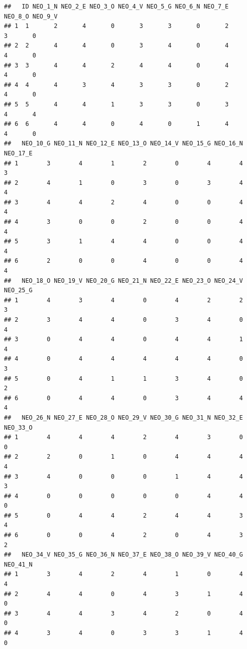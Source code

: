 \documentclass[
]{book}
\begin{document}
\begin{verbatim}
##   ID NEO_1_N NEO_2_E NEO_3_O NEO_4_V NEO_5_G NEO_6_N NEO_7_E NEO_8_O NEO_9_V
## 1  1       2       4       0       3       3       0       2       3       0
## 2  2       4       4       0       3       4       0       4       4       0
## 3  3       4       4       2       4       4       0       4       4       0
## 4  4       4       3       4       3       3       0       2       4       0
## 5  5       4       4       1       3       3       0       3       4       4
## 6  6       4       4       0       4       0       1       4       4       0
##   NEO_10_G NEO_11_N NEO_12_E NEO_13_O NEO_14_V NEO_15_G NEO_16_N NEO_17_E
## 1        3        4        1        2        0        4        4        3
## 2        4        1        0        3        0        3        4        4
## 3        4        4        2        4        0        0        4        4
## 4        3        0        0        2        0        0        4        4
## 5        3        1        4        4        0        0        4        4
## 6        2        0        0        4        0        0        4        4
##   NEO_18_O NEO_19_V NEO_20_G NEO_21_N NEO_22_E NEO_23_O NEO_24_V NEO_25_G
## 1        4        3        4        0        4        2        2        3
## 2        3        4        4        0        3        4        0        4
## 3        0        4        4        0        4        4        1        4
## 4        0        4        4        4        4        4        0        3
## 5        0        4        1        1        3        4        0        2
## 6        0        4        4        0        3        4        4        4
##   NEO_26_N NEO_27_E NEO_28_O NEO_29_V NEO_30_G NEO_31_N NEO_32_E NEO_33_O
## 1        4        4        4        2        4        3        0        0
## 2        2        0        1        0        4        4        4        4
## 3        4        0        0        0        1        4        4        3
## 4        0        0        0        0        0        4        4        0
## 5        0        4        4        2        4        4        3        4
## 6        0        0        4        2        0        4        3        2
##   NEO_34_V NEO_35_G NEO_36_N NEO_37_E NEO_38_O NEO_39_V NEO_40_G NEO_41_N
## 1        3        4        2        4        1        0        4        4
## 2        4        4        0        4        3        1        4        0
## 3        4        4        3        4        2        0        4        0
## 4        3        4        0        3        3        1        4        0

\end{verbatim}
\end{document}
